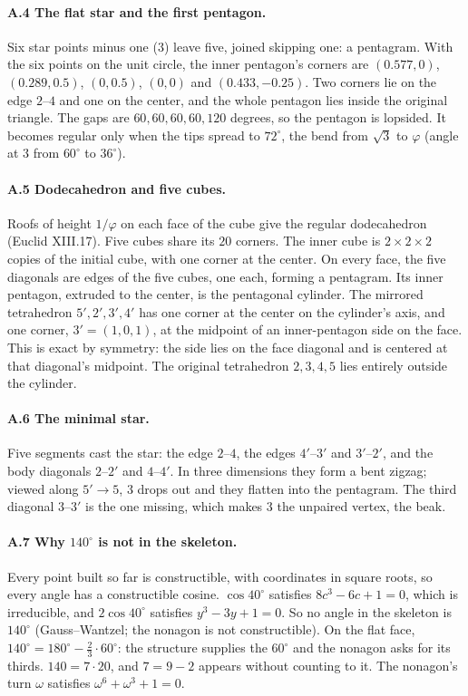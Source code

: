 \documentclass[11pt]{article}
\theoremstyle{definition}\newtheorem{claim}{Capability}
\theoremstyle{remark}
\begin{document}
\paragraph{A.4 The flat star and the first pentagon.} Six star points minus one ($3$) leave five, joined skipping one: a pentagram. With the six points on the unit circle, the inner pentagon's corners are $(0.577,0)$, $(0.289,0.5)$, $(0,0.5)$, $(0,0)$ and $(0.433,-0.25)$. Two corners lie on the edge $2$--$4$ and one on the center, and the whole pentagon lies inside the original triangle. The gaps are $60,60,60,60,120$ degrees, so the pentagon is lopsided. It becomes regular only when the tips spread to $72^\circ$, the bend from $\sqrt3$ to $\varphi$ (angle at $3$ from $60^\circ$ to $36^\circ$).

\paragraph{A.5 Dodecahedron and five cubes.} Roofs of height $1/\varphi$ on each face of the cube give the regular dodecahedron (Euclid XIII.17). Five cubes share its $20$ corners. The inner cube is $2\times2\times2$ copies of the initial cube, with one corner at the center. On every face, the five diagonals are edges of the five cubes, one each, forming a pentagram. Its inner pentagon, extruded to the center, is the pentagonal cylinder. The mirrored tetrahedron $5',2',3',4'$ has one corner at the center on the cylinder's axis, and one corner, $3'=(1,0,1)$, at the midpoint of an inner-pentagon side on the face. This is exact by symmetry: the side lies on the face diagonal and is centered at that diagonal's midpoint. The original tetrahedron $2,3,4,5$ lies entirely outside the cylinder.

\paragraph{A.6 The minimal star.} Five segments cast the star: the edge $2$--$4$, the edges $4'$--$3'$ and $3'$--$2'$, and the body diagonals $2$--$2'$ and $4$--$4'$. In three dimensions they form a bent zigzag; viewed along $5'\to5$, $3$ drops out and they flatten into the pentagram. The third diagonal $3$--$3'$ is the one missing, which makes $3$ the unpaired vertex, the beak.

\paragraph{A.7 Why $140^\circ$ is not in the skeleton.} Every point built so far is constructible, with coordinates in square roots, so every angle has a constructible cosine. $\cos 40^\circ$ satisfies $8c^3-6c+1=0$, which is irreducible, and $2\cos40^\circ$ satisfies $y^3-3y+1=0$. So no angle in the skeleton is $140^\circ$ (Gauss--Wantzel; the nonagon is not constructible). On the flat face, $140^\circ=180^\circ-\tfrac23\cdot 60^\circ$: the structure supplies the $60^\circ$ and the nonagon asks for its thirds. $140=7\cdot20$, and $7=9-2$ appears without counting to it. The nonagon's turn $\omega$ satisfies $\omega^6+\omega^3+1=0$.
\end{document}
